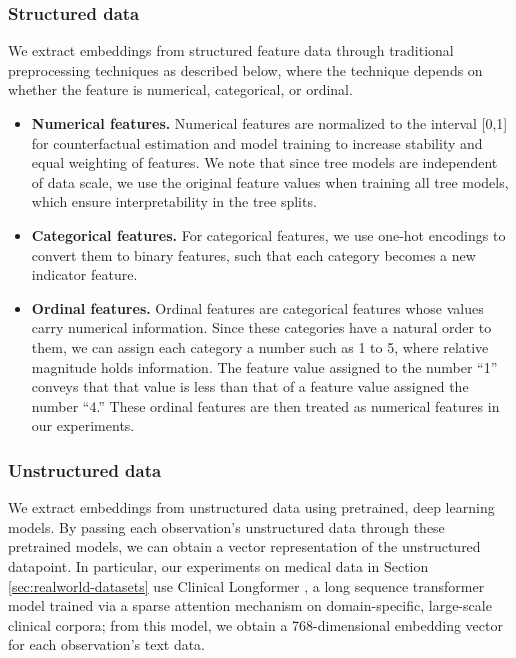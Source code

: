 \documentclass[10pt]{article} %
\begin{document}
\subsubsection{Structured data}
We extract embeddings from structured feature data through traditional preprocessing techniques as described below, where the technique depends on whether the feature is numerical, categorical, or ordinal.

\begin{itemize}
    \item \textbf{Numerical features.} Numerical features are normalized to the interval [0,1] for counterfactual estimation and model training to increase stability and equal weighting of features. We note that since tree models are independent of data scale, we use the original feature values when training all tree models, which ensure interpretability in the tree splits.
    \item \textbf{Categorical features.} For categorical features, we use one-hot encodings to convert them to binary features, such that each category becomes a new indicator feature.
    \item \textbf{Ordinal features.} Ordinal features are categorical features whose values carry numerical information. Since these categories have a natural order to them, we can assign each category a number such as 1 to 5, where relative magnitude holds information. The feature value assigned to the number ``1'' conveys that that value is less than that of a feature value assigned the number ``4.'' These ordinal features are then treated as numerical features in our experiments.
    
\end{itemize}

\subsubsection{Unstructured data} \label{subsubsec: unstructured}
We extract embeddings from unstructured data using pretrained, deep learning models. By passing each observation's unstructured data through these pretrained models, we can obtain a vector representation of the unstructured datapoint. In particular, our experiments on medical data in Section \ref{sec:realworld-datasets} use Clinical Longformer \citep{clinical-longformer}, a long sequence transformer model trained via a sparse attention mechanism on domain-specific, large-scale clinical corpora; from this model, we obtain a 768-dimensional embedding vector for each observation's text data. 
\end{document}

